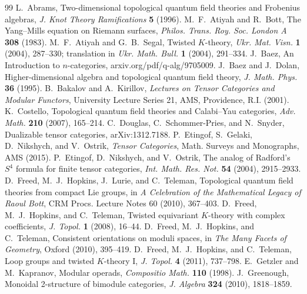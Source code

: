 \renewcommand{\bibname}{第 3 章参考文献}

\begin{thebibliography}{99}\setlength{\itemsep}{0.25em}
 L.~Abrams, Two-dimensional topological quantum field theories and
Frobenius algebras, \emph{J. Knot Theory Ramifications} \textbf{5} (1996).
 M.~F.~Atiyah and R.~Bott, The Yang--Mills equation on Riemann
surfaces, \emph{Philos. Trans. Roy. Soc. London A} \textbf{308} (1983).
 M.~F.~Atiyah and G.~B.~Segal, Twisted $K$-theory,
\emph{Ukr. Mat. Visn.} \textbf{1} (2004), 287--330; translation in \emph{Ukr. Math.
Bull.} \textbf{1} (2004), 291--334.
 J.~Baez, An Introduction to $n$-categories,
arxiv.org/pdf/q-alg/9705009.
 J.~Baez and J.~Dolan, Higher-dimensional algebra and topological
quantum field theory, \emph{J. Math. Phys.} \textbf{36} (1995).
 B.~Bakalov and A.~Kirillov, \emph{Lectures on Tensor Categories and
Modular Functors}, University Lecture Series 21, AMS, Providence, R.I. (2001).
 K.~Costello, Topological quantum field theories and Calabi--Yau
categories, \emph{Adv. Math.} \textbf{210} (2007), 165--214.
 C.~Douglas, C.~Schommer-Pries, and N.~Snyder, Dualizable
tensor categories, arXiv:1312.7188.
 P.~Etingof, S.~Gelaki, D.~Nikshych, and V.~Ostrik, \emph{Tensor
Categories}, Math. Surveys and Monographs, AMS (2015).
 P.~Etingof, D.~Nikshych, and V.~Ostrik, The analog of Radford's
$S^4$ formula for finite tensor categories, \emph{Int. Math. Res. Not.} \textbf{54}
(2004), 2915--2933.
 D.~Freed, M.~J.~Hopkins, J.~Lurie, and C.~Teleman, Topological
quantum field theories from compact Lie groups, in \emph{A Celebration of the
Mathematical Legacy of Raoul Bott}, CRM Procs. Lecture Notes 60 (2010), 367--403.
 D.~Freed, M.~J.~Hopkins, and C.~Teleman, Twisted equivariant
$K$-theory with complex coefficients, \emph{J. Topol.} \textbf{1} (2008), 16--44.
 D.~Freed, M.~J.~Hopkins, and C.~Teleman, Consistent orientations on
moduli spaces, in \emph{The Many Facets of Geometry}, Oxford (2010), 395--419.
 D.~Freed, M.~J.~Hopkins, and C.~Teleman, Loop groups and twisted
$K$-theory I, \emph{J. Topol.} \textbf{4} (2011), 737--798.
 E.~Getzler and M.~Kapranov, Modular operads, \emph{Compositio Math.}
\textbf{110} (1998).
 J.~Greenough, Monoidal 2-structure of bimodule categories,
\emph{J. Algebra} \textbf{324} (2010), 1818--1859.

\end{thebibliography}
